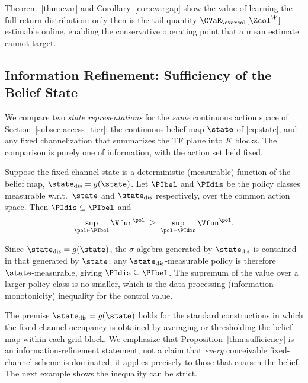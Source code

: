 \begin{remark}
Theorem~\ref{thm:cvar} and Corollary~\ref{cor:cvargap} show the value of
learning the full return distribution: only then is the tail quantity
$\CVaR_{\cvarcol}[\Zcol^{W}]$ estimable online, enabling the conservative
operating point that a mean estimate cannot target.
\end{remark}

\subsection{Information Refinement: Sufficiency of the Belief State}
\label{subsec:thmB}
We compare two \emph{state representations} for the \emph{same} continuous
action space of Section~\ref{subsec:access_tier}: the continuous belief map
$\state$ of \eqref{eq:state}, and any fixed channelization that summarizes
the TF plane into $K$ blocks. The comparison is purely one of information,
with the action set held fixed.

\begin{proposition}
\label{thm:sufficiency}
Suppose the fixed-channel state is a deterministic (measurable) function of
the belief map, $\state_{\mathrm{dis}}=g(\state)$. Let $\PIbel$ and $\PIdis$
be the policy classes measurable w.r.t.\ $\state$ and $\state_{\mathrm{dis}}$
respectively, over the common action space. Then
$\PIdis\subseteq\PIbel$ and
\begin{equation}
\sup_{\pol\in\PIbel}\Vfun^{\pol}\;\ge\;\sup_{\pol\in\PIdis}\Vfun^{\pol}.
\end{equation}
\end{proposition}

\begin{IEEEproof}
Since $\state_{\mathrm{dis}}=g(\state)$, the $\sigma$-algebra generated by
$\state_{\mathrm{dis}}$ is contained in that generated by $\state$; any
$\state_{\mathrm{dis}}$-measurable policy is therefore $\state$-measurable,
giving $\PIdis\subseteq\PIbel$. The supremum of the value over a larger
policy class is no smaller, which is the data-processing (information
monotonicity) inequality for the control value.
\end{IEEEproof}

The premise $\state_{\mathrm{dis}}=g(\state)$ holds for the standard
constructions in which the fixed-channel occupancy is obtained by averaging
or thresholding the belief map within each grid block. We emphasize that
Proposition~\ref{thm:sufficiency} is an information-refinement statement,
not a claim that \emph{every} conceivable fixed-channel scheme is dominated;
it applies precisely to those that coarsen the belief. The next example shows
the inequality can be strict.

